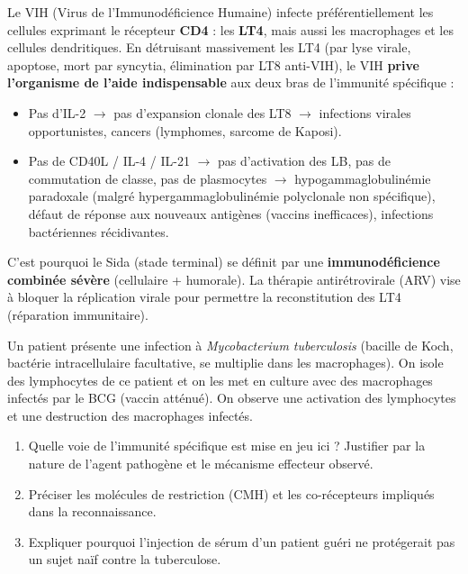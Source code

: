 \documentclass[11pt]{article}
\begin{document}
\begin{savaistu}
Le VIH (Virus de l'Immunodéficience Humaine) infecte préférentiellement les cellules exprimant le récepteur \textbf{CD4} : les \textbf{LT4}, mais aussi les macrophages et les cellules dendritiques. En détruisant massivement les LT4 (par lyse virale, apoptose, mort par syncytia, élimination par LT8 anti-VIH), le VIH \textbf{prive l'organisme de l'aide indispensable} aux deux bras de l'immunité spécifique :
\begin{itemize}
    \item Pas d'IL-2 $\to$ pas d'expansion clonale des LT8 $\to$ infections virales opportunistes, cancers (lymphomes, sarcome de Kaposi).
    \item Pas de CD40L / IL-4 / IL-21 $\to$ pas d'activation des LB, pas de commutation de classe, pas de plasmocytes $\to$ hypogammaglobulinémie paradoxale (malgré hypergammaglobulinémie polyclonale non spécifique), défaut de réponse aux nouveaux antigènes (vaccins inefficaces), infections bactériennes récidivantes.
\end{itemize}
C'est pourquoi le Sida (stade terminal) se définit par une \textbf{immunodéficience combinée sévère} (cellulaire + humorale). La thérapie antirétrovirale (ARV) vise à bloquer la réplication virale pour permettre la reconstitution des LT4 (réparation immunitaire).
\end{savaistu}

\begin{exercice}
Un patient présente une infection à \emph{Mycobacterium tuberculosis} (bacille de Koch, bactérie intracellulaire facultative, se multiplie dans les macrophages). On isole des lymphocytes de ce patient et on les met en culture avec des macrophages infectés par le BCG (vaccin atténué). On observe une activation des lymphocytes et une destruction des macrophages infectés.
\begin{enumerate}
    \item Quelle voie de l'immunité spécifique est mise en jeu ici ? Justifier par la nature de l'agent pathogène et le mécanisme effecteur observé.
    \item Préciser les molécules de restriction (CMH) et les co-récepteurs impliqués dans la reconnaissance.
    \item Expliquer pourquoi l'injection de sérum d'un patient guéri ne protégerait pas un sujet naïf contre la tuberculose.
\end{enumerate}
\end{exercice}
\end{document}
